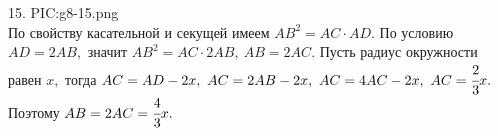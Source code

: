 15. {{PIC:g8-15.png}}\\
По свойству касательной и секущей имеем $AB^2=AC\cdot AD.$ По условию $AD=2AB,$ значит $AB^2=AC\cdot2AB,\ AB=2AC.$ Пусть радиус окружности равен $x,$ тогда $AC=AD-2x,\ AC=2AB-2x,\ AC=4AC-2x,\ AC=\cfrac{2}{3}x.$ Поэтому $AB=2AC=\cfrac{4}{3}x.$\\
